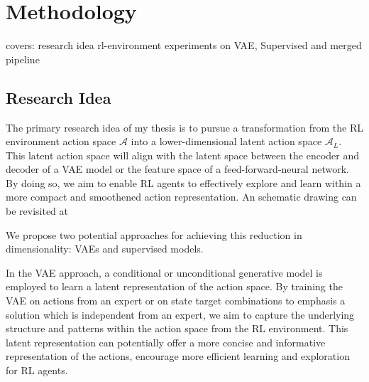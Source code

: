 \chapter{Methodology}\label{chap:Methodology}

covers:
research idea
rl-environment
experiments on VAE, Supervised and merged pipeline

\section{Research Idea}

The primary research idea of my thesis is to pursue a transformation from the RL environment action space $\mathcal{A}$ into a lower-dimensional latent action space $\mathcal{A}_L$. This latent action space will align with the latent space between the encoder and decoder of a VAE model or the feature space of a feed-forward-neural network. By doing so, we aim to enable RL agents to effectively explore and learn within a more compact and smoothened action representation. An schematic drawing can be revisited at 

We propose two potential approaches for achieving this reduction in dimensionality: VAEs and supervised models.

In the VAE approach, a conditional or unconditional generative model is employed to learn a latent representation of the action space. By training the VAE on actions from an expert or on state target combinations to emphasis a solution which is independent from an expert, we aim to capture the underlying structure and patterns within the action space from the RL environment. This latent representation can potentially offer a more concise and informative representation of the actions, encourage more efficient learning and exploration for RL agents.

